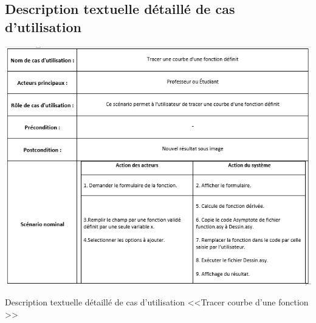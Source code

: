 \documentclass[a4paper]{report}
\begin{document}
\subsection{Description textuelle détaillé de cas d'utilisation}
\begin{table}[!h]
    \includegraphics[width=16cm]{images/TableDescActi.PNG}
    \caption{Description textuelle détaillé de cas d'utilisation <<Tracer courbe d'une fonction >>}
    \label{tab: Description textuelle détaillé de cas d'utilisation <<Tracer courbe d'une fonction >>}
\end{table}
\end{document}
